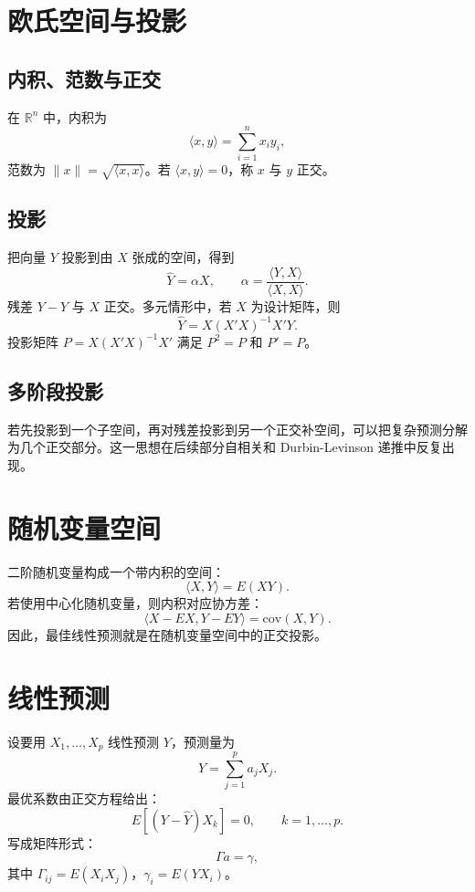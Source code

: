 \documentclass[11pt,a4paper,openany]{ctexbook}
\begin{document}
\section{欧氏空间与投影}

\subsection{内积、范数与正交}

在 \(\mathbb R^n\) 中，内积为
\[
  \langle x,y\rangle=\sum_{i=1}^n x_i y_i,
\]
范数为 \(\|x\|=\sqrt{\langle x,x\rangle}\)。若 \(\langle x,y\rangle=0\)，称 \(x\) 与 \(y\) 正交。

\subsection{投影}

把向量 \(Y\) 投影到由 \(X\) 张成的空间，得到
\[
  \hat Y=\alpha X,\qquad
  \alpha=\frac{\langle Y,X\rangle}{\langle X,X\rangle}.
\]
残差 \(Y-\hat Y\) 与 \(X\) 正交。多元情形中，若 \(X\) 为设计矩阵，则
\[
  \hat Y=X(X'X)^{-1}X'Y.
\]
投影矩阵 \(P=X(X'X)^{-1}X'\) 满足 \(P^2=P\) 和 \(P'=P\)。

\subsection{多阶段投影}

若先投影到一个子空间，再对残差投影到另一个正交补空间，可以把复杂预测分解为几个正交部分。这一思想在后续部分自相关和 Durbin-Levinson 递推中反复出现。

\section{随机变量空间}

二阶随机变量构成一个带内积的空间：
\[
  \langle X,Y\rangle=E(XY).
\]
若使用中心化随机变量，则内积对应协方差：
\[
  \langle X-E X,Y-EY\rangle=\mathrm{cov}(X,Y).
\]
因此，最佳线性预测就是在随机变量空间中的正交投影。

\section{线性预测}

设要用 \(X_1,\ldots,X_p\) 线性预测 \(Y\)，预测量为
\[
  \hat Y=\sum_{j=1}^p a_jX_j.
\]
最优系数由正交方程给出：
\[
  E\left[(Y-\hat Y)X_k\right]=0,\qquad k=1,\ldots,p.
\]
写成矩阵形式：
\[
  \Gamma a=\gamma,
\]
其中 \(\Gamma_{ij}=E(X_iX_j)\)，\(\gamma_i=E(YX_i)\)。
\end{document}
